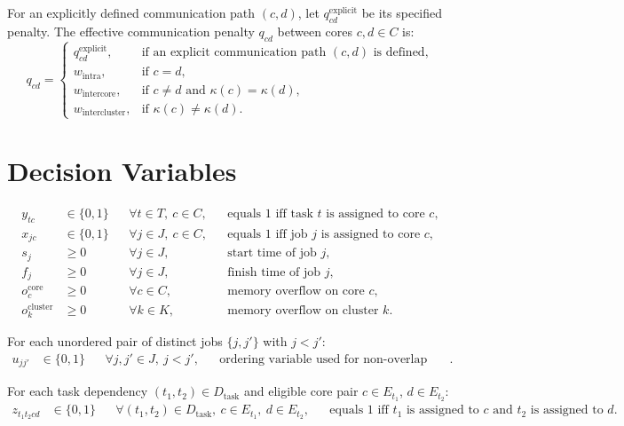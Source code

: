 \documentclass[11pt,a4paper]{article}
\begin{document}
For an explicitly defined communication path $(c,d)$, let $q_{cd}^{\mathrm{explicit}}$ be its specified penalty. The effective communication penalty $q_{cd}$ between cores $c,d \in C$ is:
\begin{equation}
q_{cd} =
\begin{cases}
q_{cd}^{\mathrm{explicit}}, & \text{if an explicit communication path } (c,d) \text{ is defined},\\
w_{\mathrm{intra}}, & \text{if } c=d,\\
w_{\mathrm{intercore}}, & \text{if } c \neq d \text{ and } \kappa(c)=\kappa(d),\\
w_{\mathrm{intercluster}}, & \text{if } \kappa(c)\neq \kappa(d).
\end{cases}
\end{equation}

\section{Decision Variables}

\begin{align*}
y_{tc} &\in \{0,1\}
&& \forall t \in T,\ c \in C,
&& \text{equals 1 iff task } t \text{ is assigned to core } c,\\
x_{jc} &\in \{0,1\}
&& \forall j \in J,\ c \in C,
&& \text{equals 1 iff job } j \text{ is assigned to core } c,\\
s_j &\geq 0
&& \forall j \in J,
&& \text{start time of job } j,\\
f_j &\geq 0
&& \forall j \in J,
&& \text{finish time of job } j,\\
o_c^{\mathrm{core}} &\geq 0
&& \forall c \in C,
&& \text{memory overflow on core } c,\\
o_k^{\mathrm{cluster}} &\geq 0
&& \forall k \in K,
&& \text{memory overflow on cluster } k.
\end{align*}

For each unordered pair of distinct jobs $\{j, j'\}$ with $j < j'$:
\begin{align*}
u_{jj'} &\in \{0,1\}
&& \forall j, j' \in J,\ j<j',
&& \text{ordering variable used for non-overlap constraints}.
\end{align*}

For each task dependency $(t_1,t_2)\in D_{\mathrm{task}}$ and eligible core pair $c \in E_{t_1}$, $d \in E_{t_2}$:
\begin{align*}
z_{t_1 t_2 cd} &\in \{0,1\}
&& \forall (t_1,t_2)\in D_{\mathrm{task}},\ c\in E_{t_1},\ d\in E_{t_2},
&& \text{equals 1 iff } t_1 \text{ is assigned to } c \text{ and } t_2 \text{ is assigned to } d.
\end{align*}
\end{document}
